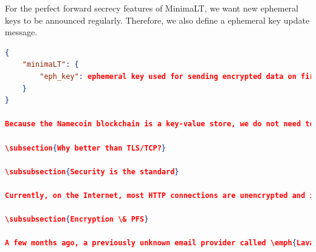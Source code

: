 \documentclass{vldb}
\begin{document}
For the perfect forward secrecy features of MinimaLT, we want new ephemeral keys to be announced regularly. Therefore, we also define a ephemeral key update message. 

\begin{lstlisting}[language=json,firstnumber=1]
{
    "minimaLT": {
        "eph_key": ephemeral key used for sending encrypted data on first RTT.
    }
}

Because the Namecoin blockchain is a key-value store, we do not need to specify what the address of our service is because it's the key of this entry. However, we do need to sign this ephemeral key update message with our Namecoin private key. 

\subsection{Why better than TLS/TCP?}

\subsubsection{Security is the standard}

Currently, on the Internet, most HTTP connections are unencrypted and if they are, the Apache or Ngnix configuration is often badly configured in such a way that it could be attacked. MinimaLT was designed to prevent system administrators to make security mistakes. Never will you have to manually pick cipher suites or worry about OpenSSL compatibility, MinimaLT does it all for you. Not only does it encrypt all communications between two hosts but it defaults on strong ciphers\footnote{MinimaLT uses Curve25519 for the public-key cryptography}.

\subsubsection{Encryption \& PFS}

A few months ago, a previously unknown email provider called \emph{Lavabit} got under pressure from the US government to hand over its private SSL key. The reason turned out to be that Snowden used the email service. If Lavabit turned over the SSL keys, they would compromise the privacy of their entire user base. This is due to poorly configured SSL where the ECDHE is not the default. ECDHE performs a Elliptic curve Diffie–Hellman key exchange. The last E from ECDHE stands for ephemeral which means that a new key is generated at every handshake and that key will never be stored. Hence, if later the server gets compromised or the network operator is forced to hand over an encryption key this is something that he won't be able to provide. Unfortunately, most system administrators don't put the \emph{ECDHE} ciphers on top of their ciphers list which results in the lack of Perfect Forward Secrecy.


\end{lstlisting}
\end{document}
